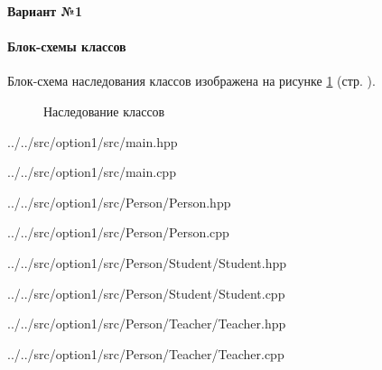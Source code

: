 \begin{center}
    \textbf{Вариант №1}
\end{center}

\paragraph{Блок-схемы классов}

Блок-схема наследования классов изображена на рисунке \ref{fig:task-variant-1} (стр. \pageref{fig:task-variant-1}).

\begin{figure}[!htp]
    \caption{Наследование классов}
    \label{fig:task-variant-1}
\end{figure}


{../../src/option1/src/main.hpp}


{../../src/option1/src/main.cpp}

\newpage


{../../src/option1/src/Person/Person.hpp}


{../../src/option1/src/Person/Person.cpp}

\newpage


{../../src/option1/src/Person/Student/Student.hpp}


{../../src/option1/src/Person/Student/Student.cpp}

\newpage


{../../src/option1/src/Person/Teacher/Teacher.hpp}


{../../src/option1/src/Person/Teacher/Teacher.cpp}

\newpage

